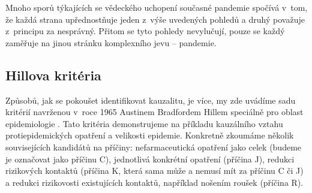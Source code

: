 Mnoho sporů týkajících se vědeckého uchopení současné pandemie spočívá v~tom, že každá strana upřednostňuje jeden z~výše uvedených pohledů a druhý považuje z~principu za nesprávný. Přitom se tyto pohledy nevylučují, pouze se každý zaměřuje na jinou stránku komplexního jevu -- pandemie. 


\subsection*{Hillova kritéria}

Způsobů, jak se pokoušet identifikovat kauzalitu, je více,
my zde uvádíme sadu kritérií navrženou v~roce 1965 Austinem Bradfordem Hillem
speciálně pro oblast epidemiologie \cite{hill1965environment}. Tato kritéria demonstrujeme na příkladu kauzálního vztahu protiepidemických opatření a velikosti epidemie. Konkretně zkoumáme několik souvisejících kandidátů na příčiny: nefarmaceutická opatření jako celek (budeme je označovat jako příčinu C),
jednotlivá konkrétní opatření (příčina J), redukci rizikových
kontaktů (příčina K, která sama může a nemusí mít za příčinu C či
J) a redukci rizikovosti existujících kontaktů, například nošením roušek (příčina
R). 


